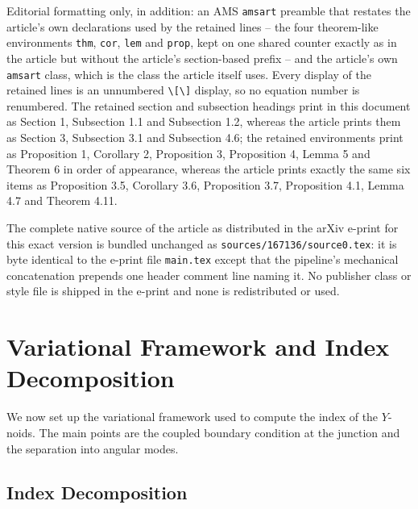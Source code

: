 \documentclass[10pt,a4paper]{amsart}
\begin{document}
Editorial formatting only, in addition: an AMS \texttt{amsart} preamble that restates the article's own declarations used by the retained lines -- the four theorem-like environments \texttt{thm}, \texttt{cor}, \texttt{lem} and \texttt{prop}, kept on one shared counter exactly as in the article but without the article's section-based prefix -- and the article's own \texttt{amsart} class, which is the class the article itself uses. Every display of the retained lines is an unnumbered \texttt{\textbackslash[}\texttt{\textbackslash]} display, so no equation number is renumbered. The retained section and subsection headings print in this document as Section 1, Subsection 1.1 and Subsection 1.2, whereas the article prints them as Section 3, Subsection 3.1 and Subsection 4.6; the retained environments print as Proposition 1, Corollary 2, Proposition 3, Proposition 4, Lemma 5 and Theorem 6 in order of appearance, whereas the article prints exactly the same six items as Proposition 3.5, Corollary 3.6, Proposition 3.7, Proposition 4.1, Lemma 4.7 and Theorem 4.11.

The complete native source of the article as distributed in the arXiv e-print for this exact version is bundled unchanged as \texttt{sources/167136/source0.tex}: it is byte identical to the e-print file \texttt{main.tex} except that the pipeline's mechanical concatenation prepends one header comment line naming it. No publisher class or style file is shipped in the e-print and none is redistributed or used.
\section{Variational Framework and Index Decomposition} \label{sec: index evaluation on catenoidal}
We now set up the variational framework used to compute the index of the $Y$-noids. The main points are the coupled boundary condition at the junction and the separation into angular modes.

\subsection{Index Decomposition} \label{subsec: index decomp}
\end{document}
